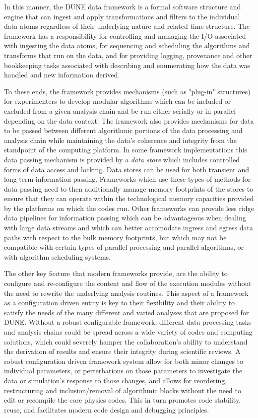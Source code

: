 \documentclass[../main-v1.tex]{subfiles}
\begin{document}
In this manner, the DUNE data framework is a formal software structure and engine that can ingest and apply transformations and filters to the individual data atoms regardless of their underlying nature and related time structure.  The framework has a responsibility for controlling and managing the I/O associated with ingesting the data atoms, for sequencing and scheduling the algorithms and transforms that run on the data, and for providing logging, provenance and other bookkeeping tasks associated with describing and enumerating how the data was handled and new information derived.  

To these ends, the framework provides mechanisms (such as "plug-in" structures) for experimenters to develop modular algorithms which can be included or excluded from a given analysis chain and be run either serially or in parallel depending on the data context.  The framework also provides mechanisms for data to be passed between different algorithmic portions of the data processing and analysis chain while maintaining the data's coherence and integrity from the standpoint of the computing platform.  In some framework implementations this data passing mechanism is provided by a {\it data store} which includes controlled forms of data access and locking.  Data stores can be used for both transient and long term information passing.  Frameworks which use these types of methods for data passing need to then additionally manage memory footprints of the stores to ensure that they can operate within the technological memory capacities provided by the platforms on which the codes run.  Other frameworks can provide less ridge data pipelines for information passing which can be advantageous when dealing with large data streams and which can better accomodate ingress and egress data paths with respect to the bulk memory footprints, but which may not be compatible with certain types of parallel processing and parallel algorithms, or with algorithm scheduling systems.

The other key feature that modern frameworks provide, are the ability to configure and re-configure the content and flow of the execution modules without the need to rewrite the underlying analysis routines.  This aspect of a framework as a configuration driven entity is key to their flexibility and their ability to satisfy the needs of the many different and varied analyses that are proposed for DUNE.  Without a robust configurable framework, different data processing tasks and analysis chains could be spread across a wide variety of codes and computing solutions, which could severely hamper the collaboration's ability to understand the derivation of results and ensure their integrity during scientific reviews.  A robust configuration driven framework system allow for both minor changes to individual parameters, or perterbations on those parameters to investigate the data or simulation's response to those changes, and allows for reordering, restructuring and inclusion/removal of algorithmic blocks without the need to edit or recompile the core physics codes.  This in turn promotes code stability, reuse, and facilitates modern code design and debugging principles.  
\end{document}
